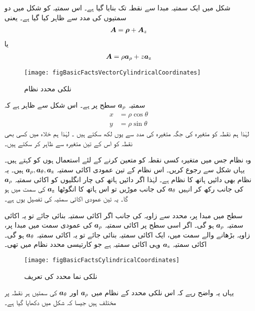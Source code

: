 شکل   میں ایک سمتیہ   مبدا سے نقطہ  تک بنایا گیا ہے۔ اس سمتیہ کو شکل میں دو سمتیوں کی مدد سے ظاہر کیا گیا ہے۔ یعنی
\begin{align}
{\ensuremath{{\boldsymbol{A}}}}={{\boldsymbol{\rho}}}+{{\boldsymbol{A}}}_z
\end{align}
یا
\begin{align}
{\ensuremath{{\boldsymbol{A}}}}=\rho {\boldsymbol{a}}_{\rho}+z {\boldsymbol{a}}_{\textup{z}}
\end{align}
%
\begin{figure}
\centering
\texttt{[image: figBasicFactsVectorCylindricalCoordinates]}
\caption{نلکی محدد نظام}
\label{شکل_حقائق_نلکی_نظام_ایک_سمتیہ}
\end{figure}
سمتیہ ${\boldsymbol{a}}_{\rho}$ سطح  پر ہے۔ اس شکل سے ظاہر ہے کہ
\begin{align}
x&=\rho \cos \theta\\
y&=\rho \sin \theta
\end{align}
لہٰذا ہم نقطہ  کو متغیرہ  کی جگہ متغیرہ  کی مدد سے یوں لکھ سکتے ہیں ۔ لہٰذا ہم خلاء میں کسی بھی نقطہ کو اس کے تین متغیرہ  سے ظاہر کر سکتے ہیں۔

	وہ نظام جس میں متغیرہ   کسی نقطہ کو متعین کرنے کے لئے استعمال ہوں  کو 
 کہتے ہیں۔یہاں شکل   سے رجوع کریں۔ اس نظام کے تین عمودی  اکائی سمتیہ ${\boldsymbol{a}}_{\rho},{\boldsymbol{a}}_{\theta},{\boldsymbol{a}}_{\textup{z}}$ ہیں۔ یہ نظام بھی دائیں ہاتھ کا نظام ہے۔ لہٰذا اگر دائیں ہاتھ کی چار انگلیوں کو اکائی سمتیہ ${\boldsymbol{a}}_{\rho}$ کی جانب رکھ کر انہیں ${\boldsymbol{a}}_{\theta}$ کی جانب موڑیں تو اس ہاتھ کا انگوٹھا ${\boldsymbol{a}}_{\textup{z}}$ کی سمت میں ہو گا۔ یہ تین عمودی اکائی سمتیہ کی تفصیل یوں ہے۔

سطح  میں مبدا پر، محدد  سے  زاویہ  کی  جانب اگر  اکائی سمتیہ بنائی جائے تو یہ اکائی سمتیہ ${\boldsymbol{a}}_{\rho}$ ہو گی۔ اگر اسی سطح   پر اکائی سمتیہ ${\boldsymbol{a}}_{\rho}$ کی عمودی سمت میں مبدا پر، زاویہ   بڑھانے والے سمت میں، ایک اکائی سمتیہ بنائی جائے تو یہ  اکائی سمتیہ ${\boldsymbol{a}}_{\theta}$ ہو گی۔ اکائی سمتیہ ${\boldsymbol{a}}_{\textup{z}}$ وہی اکائی سمتیہ ہے جو کارتیسی محدد نظام میں تھی۔ 
\begin{figure}
\centering
\texttt{[image: figBasicFactsCylindricalCoordinates]}
\caption{نلکی نما محدد کی تعریف}
\label{شکل_حقائق_نلکی_نظام_تعریف}
\end{figure}
	یہاں یہ واضح رہے کہ اس نلکی محدد کے نظام  میں ${\boldsymbol{a}}_{\rho}$ اور  ${\boldsymbol{a}}_{\theta}$ کی سمتیں ہر نقطہ پر مختلف ہیں جیسا کہ شکل  میں دکھایا گیا ہے۔

